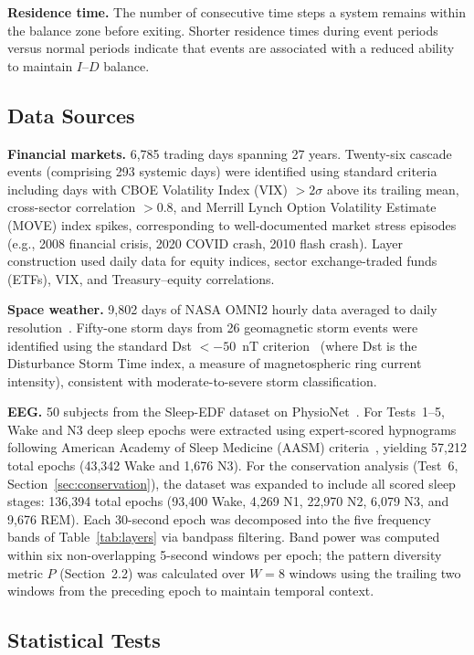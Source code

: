 \documentclass[12pt,a4paper]{article}
\begin{document}
\textbf{Residence time.} The number of consecutive time steps a system remains within the balance zone before exiting. Shorter residence times during event periods versus normal periods indicate that events are associated with a reduced ability to maintain $I$--$D$ balance.

\subsection{Data Sources}

\textbf{Financial markets.} 6,785 trading days spanning 27 years. Twenty-six cascade events (comprising 293 systemic days) were identified using standard criteria including days with CBOE Volatility Index (VIX) $> 2\sigma$ above its trailing mean, cross-sector correlation $> 0.8$, and Merrill Lynch Option Volatility Estimate (MOVE) index spikes, corresponding to well-documented market stress episodes (e.g., 2008 financial crisis, 2020 COVID crash, 2010 flash crash). Layer construction used daily data for equity indices, sector exchange-traded funds (ETFs), VIX, and Treasury--equity correlations.

\textbf{Space weather.} 9,802 days of NASA OMNI2 hourly data averaged to daily resolution~\cite{papitashvili2020}. Fifty-one storm days from 26 geomagnetic storm events were identified using the standard Dst $< -50$~nT criterion~\cite{gonzalez1994} (where Dst is the Disturbance Storm Time index, a measure of magnetospheric ring current intensity), consistent with moderate-to-severe storm classification.

\textbf{EEG.} 50 subjects from the Sleep-EDF dataset on PhysioNet~\cite{kemp2000,goldberger2000}. For Tests~1--5, Wake and N3 deep sleep epochs were extracted using expert-scored hypnograms following American Academy of Sleep Medicine (AASM) criteria~\cite{berry2017}, yielding 57,212 total epochs (43,342 Wake and 1,676 N3). For the conservation analysis (Test~6, Section~\ref{sec:conservation}), the dataset was expanded to include all scored sleep stages: 136,394 total epochs (93,400 Wake, 4,269 N1, 22,970 N2, 6,079 N3, and 9,676 REM). Each 30-second epoch was decomposed into the five frequency bands of Table~\ref{tab:layers} via bandpass filtering. Band power was computed within six non-overlapping 5-second windows per epoch; the pattern diversity metric $P$ (Section~2.2) was calculated over $W = 8$ windows using the trailing two windows from the preceding epoch to maintain temporal context.

\subsection{Statistical Tests}
\end{document}
